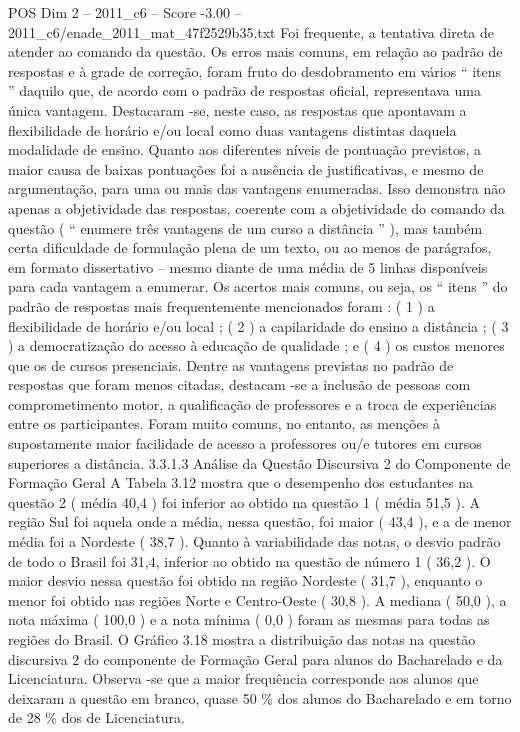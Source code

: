 \begin{textsample}{POS Dim 2 – 2011\_c6 – Score -3.00 – 2011\_c6/enade\_2011\_mat\_47f2529b35.txt}
Foi frequente, a tentativa direta de atender ao comando da questão.
Os erros mais comuns, em relação ao padrão de respostas e à grade de correção, foram fruto do desdobramento em vários “ itens ” daquilo que, de acordo com o padrão de respostas oficial, representava uma única vantagem.
Destacaram -se, neste caso, as respostas que apontavam a flexibilidade de horário e/ou local como duas vantagens distintas daquela modalidade de ensino.
Quanto aos diferentes níveis de pontuação previstos, a maior causa de baixas pontuações foi a ausência de justificativas, e mesmo de argumentação, para uma ou mais das vantagens enumeradas.
Isso demonstra não apenas a objetividade das respostas, coerente com a objetividade do comando da questão ( “ enumere três vantagens de um curso a distância ” ), mas também certa dificuldade de formulação plena de um texto, ou ao menos de parágrafos, em formato dissertativo – mesmo diante de uma média de 5 linhas disponíveis para cada vantagem a enumerar.
Os acertos mais comuns, ou seja, os “ itens ” do padrão de respostas mais frequentemente mencionados foram : ( 1 ) a flexibilidade de horário e/ou local ; ( 2 ) a capilaridade do ensino a distância ; ( 3 ) a democratização do acesso à educação de qualidade ; e ( 4 ) os custos menores que os de cursos presenciais.
Dentre as vantagens previstas no padrão de respostas que foram menos citadas, destacam -se a inclusão de pessoas com comprometimento motor, a qualificação de professores e a troca de experiências entre os participantes.
Foram muito comuns, no entanto, as menções à supostamente maior facilidade de acesso a professores ou/e tutores em cursos superiores a distância. 3.3.1.3 Análise da Questão Discursiva 2 do Componente de Formação Geral A Tabela 3.12 mostra que o desempenho dos estudantes na questão 2 ( média 40,4 ) foi inferior ao obtido na questão 1 ( média 51,5 ).
A região Sul foi aquela onde a média, nessa questão, foi maior ( 43,4 ), e a de menor média foi a Nordeste ( 38,7 ).
Quanto à variabilidade das notas, o desvio padrão de todo o Brasil foi 31,4, inferior ao obtido na questão de número 1 ( 36,2 ).
O maior desvio nessa questão foi obtido na região Nordeste ( 31,7 ), enquanto o menor foi obtido nas regiões Norte e Centro-Oeste ( 30,8 ).
A mediana ( 50,0 ), a nota máxima ( 100,0 ) e a nota mínima ( 0,0 ) foram as mesmas para todas as regiões do Brasil.
O Gráfico 3.18 mostra a distribuição das notas na questão discursiva 2 do componente de Formação Geral para alunos do Bacharelado e da Licenciatura.
Observa -se que a maior frequência corresponde aos alunos que deixaram a questão em branco, quase 50 \% dos alunos do Bacharelado e em torno de 28 \% dos de Licenciatura.

\end{textsample}
